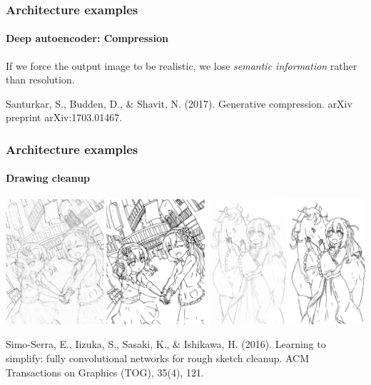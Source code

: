 \documentclass[9pt]{beamer}
\begin{document}
\begin{frame}
  \frametitle{Architecture examples}

  \framesubtitle{Deep autoencoder: Compression}

  \begin{center}
  \end{center}

  \medskip

  If we force the output image to be realistic, we lose
  \emph{semantic information} rather than resolution.

  \bigskip

  {\footnotesize Santurkar, S., Budden, D., \& Shavit,
    N. (2017). Generative compression. arXiv preprint
    arXiv:1703.01467.}
\end{frame}

\begin{frame}
  \frametitle{Architecture examples}

  \framesubtitle{Drawing cleanup}

  \begin{center}
    \includegraphics[width = \linewidth]{images/drawing_simplification_example.png}
  \end{center}

  \bigskip

  {\footnotesize Simo-Serra, E., Iizuka, S., Sasaki, K., \& Ishikawa,
    H. (2016). Learning to simplify: fully convolutional networks for
    rough sketch cleanup. ACM Transactions on Graphics (TOG), 35(4),
    121.}
\end{frame}
\end{document}
